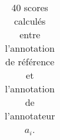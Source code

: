\begin{table}
\begin{tabular}{|l|l|l|l|l|}
\end{tabular}
\label{tab:tousScoresAnnotateurs}
\caption{40 scores calculés entre l'annotation de référence et l'annotation de l'annotateur $a_i$.}
\end{table}
